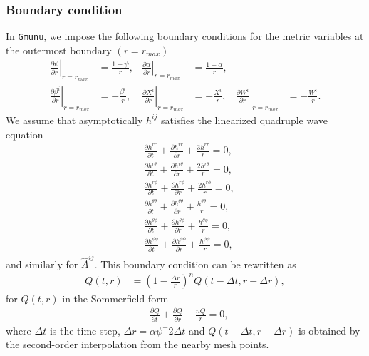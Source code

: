 \subsubsection{Boundary condition}
In \texttt{Gmunu}, we impose the following boundary conditions for the metric variables at the outermost boundary $(r=r_{max})$
\begin{align}
    \left.\frac{\partial \psi}{\partial r}\right|_{r=r_{max}} &= \frac{1-\psi}{r},
    &\left.\frac{\partial \alpha}{\partial r}\right|_{r=r_{max}} &= \frac{1-\alpha}{r}, \\
    \left.\frac{\partial \beta^i}{\partial r}\right|_{r=r_{max}} &= -\frac{\beta^i}{r},
    &\left.\frac{\partial X^i}{\partial r}\right|_{r=r_{max}} &= -\frac{X^i}{r}, 
    &\left.\frac{\partial W^i}{\partial r}\right|_{r=r_{max}} &= -\frac{W^i}{r}.
\end{align}
We assume that asymptotically $h^{ij}$ satisfies the linearized quadruple wave equation \cite{teukolsky1982linearized}
\begin{align}
    &\frac{\partial h^{rr}}{\partial t} + \frac{\partial h^{rr}}{\partial r} + \frac{3 h^{rr}}{r} = 0, \\
    &\frac{\partial h^{r\theta}}{\partial t} + \frac{\partial h^{r\theta}}{\partial r} + \frac{2 h^{r\theta}}{r} = 0, \\
    &\frac{\partial h^{r\phi}}{\partial t} + \frac{\partial h^{r\phi}}{\partial r} + \frac{2 h^{r\phi}}{r} = 0, \\
    &\frac{\partial h^{\theta\theta}}{\partial t} + \frac{\partial h^{\theta\theta}}{\partial r} + \frac{h^{\theta\theta}}{r} = 0, \\
    &\frac{\partial h^{\theta\phi}}{\partial t} + \frac{\partial h^{\theta\phi}}{\partial r} + \frac{h^{\theta\phi}}{r} = 0, \\
    &\frac{\partial h^{\phi\phi}}{\partial t} + \frac{\partial h^{\phi\phi}}{\partial r} + \frac{h^{\phi\phi}}{r} = 0,
\end{align}
and similarly for $\hat{A}^{ij}$.
This boundary condition can be rewritten as \cite{shibata1995evolution}
\begin{align}
    Q(t,r) &= \left(1 - \frac{\Delta r}{r} \right)^n Q(t-\Delta t, r - \Delta r),
\end{align}
for $Q(t,r)$ in the Sommerfield form
\begin{align}
    &\frac{\partial Q}{\partial t} + \frac{\partial Q}{\partial r} + \frac{n Q}{r} = 0,
\end{align}
where $\Delta t$ is the time step, $\Delta r = \alpha \psi^-2 \Delta t$
and $Q(t-\Delta t, r - \Delta r)$ is obtained by the second-order interpolation from the nearby mesh points.
